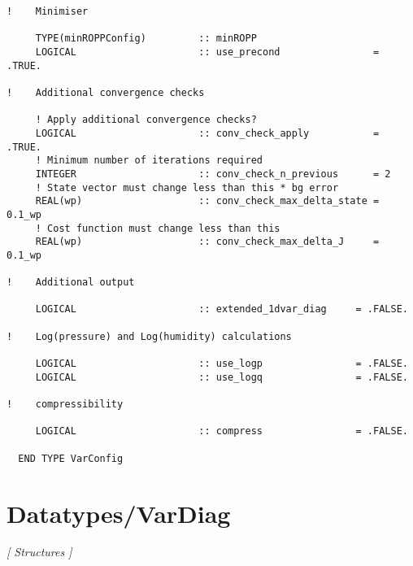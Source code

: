 \begin{Verbatim}
!    Minimiser

     TYPE(minROPPConfig)         :: minROPP
     LOGICAL                     :: use_precond                = .TRUE.

!    Additional convergence checks

     ! Apply additional convergence checks?
     LOGICAL                     :: conv_check_apply           = .TRUE.    
     ! Minimum number of iterations required
     INTEGER                     :: conv_check_n_previous      = 2         
     ! State vector must change less than this * bg error
     REAL(wp)                    :: conv_check_max_delta_state = 0.1_wp    
     ! Cost function must change less than this
     REAL(wp)                    :: conv_check_max_delta_J     = 0.1_wp     

!    Additional output

     LOGICAL                     :: extended_1dvar_diag     = .FALSE.

!    Log(pressure) and Log(humidity) calculations

     LOGICAL                     :: use_logp                = .FALSE.
     LOGICAL                     :: use_logq                = .FALSE.

!    compressibility 
     
     LOGICAL                     :: compress                = .FALSE. 

  END TYPE VarConfig
\end{Verbatim}
\section{Datatypes/VarDiag}
\textsl{[ Structures ]}

